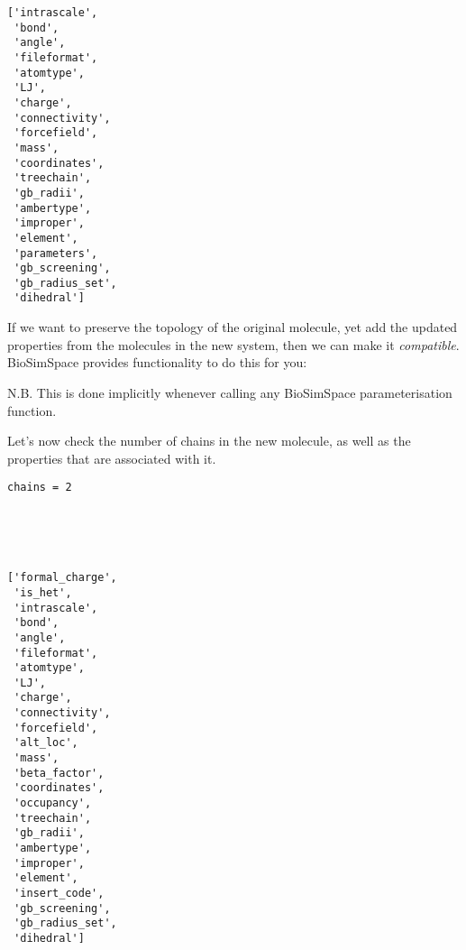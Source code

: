 \begin{verbatim}
['intrascale',
 'bond',
 'angle',
 'fileformat',
 'atomtype',
 'LJ',
 'charge',
 'connectivity',
 'forcefield',
 'mass',
 'coordinates',
 'treechain',
 'gb_radii',
 'ambertype',
 'improper',
 'element',
 'parameters',
 'gb_screening',
 'gb_radius_set',
 'dihedral']
\end{verbatim}

If we want to preserve the topology of the original molecule, yet add
the updated properties from the molecules in the new system, then we can
make it \emph{compatible}. BioSimSpace provides functionality to do this
for you:

\begin{Shaded}
\begin{Highlighting}[]
\OperatorTok{=}\NormalTok{ system_pdb[}\NormalTok{]}

\end{Highlighting}
\end{Shaded}

N.B. This is done implicitly whenever calling any BioSimSpace
parameterisation function.

Let's now check the number of chains in the new molecule, as well as the
properties that are associated with it.

\begin{Shaded}
\begin{Highlighting}[]
\NormalTok{(}\SpecialCharTok{\{}\SpecialCharTok{\}}\NormalTok{)}
\end{Highlighting}
\end{Shaded}

\begin{verbatim}
chains = 2





['formal_charge',
 'is_het',
 'intrascale',
 'bond',
 'angle',
 'fileformat',
 'atomtype',
 'LJ',
 'charge',
 'connectivity',
 'forcefield',
 'alt_loc',
 'mass',
 'beta_factor',
 'coordinates',
 'occupancy',
 'treechain',
 'gb_radii',
 'ambertype',
 'improper',
 'element',
 'insert_code',
 'gb_screening',
 'gb_radius_set',
 'dihedral']
\end{verbatim}
